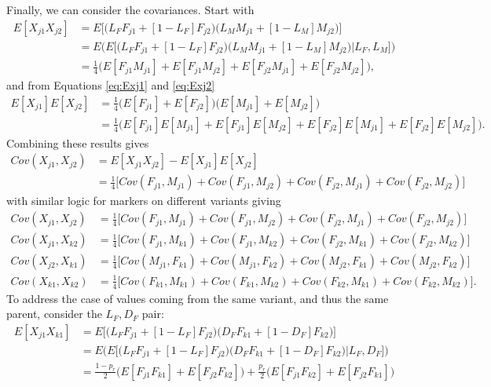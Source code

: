 \documentclass{article}
\begin{document}
Finally, we can consider the covariances. Start with
\begin{align*}
  E[X_{j1} X_{j2}] & = E \Big [ \big ( L_F F_{j1} + [1 - L_F] F_{j2} \big ) \big ( L_M M_{j1} + [1 - L_M] M_{j2} \big ) \Big ] \\
                    & = E \Bigg ( E \Big [ \big ( L_F F_{j1} + [1 - L_F] F_{j2} \big ) \big ( L_M M_{j1} + [1 - L_M] M_{j2} \big ) \Big | L_F, L_M \Big ] \Bigg )\\
  & = \frac{1}{4} \Big ( E[F_{j1} M_{j1}] + E[F_{j1} M_{j2}] + E[F_{j2} M_{j1}] + E[F_{j2} M_{j2}] \Big ),
\end{align*}
and from Equations \ref{eq:Exj1} and \ref{eq:Exj2}
\begin{align*}
  E[X_{j1}] E[X_{j2}] & = \frac{1}{4} \Big ( E[F_{j1}] + E[F_{j2}] \Big ) \Big ( E[M_{j1}] + E[M_{j2}] \Big ) \\
  & = \frac{1}{4} \Big ( E[F_{j1}] E[M_{j1}] + E[F_{j1}] E[M_{j2}] + E[F_{j2}] E[M_{j1}] + E[F_{j2}] E[M_{j2}] \Big ).
\end{align*}
Combining these results gives
\begin{align*}
  Cov(X_{j1}, X_{j2}) & = E[X_{j1} X_{j2}] - E[X_{j1}] E[X_{j2}] \\
                      & = \frac{1}{4} \Big [ Cov(F_{j1}, M_{j1}) + Cov(F_{j1}, M_{j2}) + Cov(F_{j2}, M_{j1}) + Cov(F_{j2}, M_{j2}) \Big ]
\end{align*}
with similar logic for markers on different variants giving
\begin{align}
  Cov(X_{j1}, X_{j2}) & = \frac{1}{4} \Big [ Cov(F_{j1}, M_{j1}) + Cov(F_{j1}, M_{j2}) + Cov(F_{j2}, M_{j1}) + Cov(F_{j2}, M_{j2}) \Big ] \label{eq:covj1j2} \\
  Cov(X_{j1}, X_{k2}) & = \frac{1}{4} \Big [ Cov(F_{j1}, M_{k1}) + Cov(F_{j1}, M_{k2}) + Cov(F_{j2}, M_{k1}) + Cov(F_{j2}, M_{k2}) \Big ] \label{eq:covj1k2} \\
  Cov(X_{j2}, X_{k1}) & = \frac{1}{4} \Big [ Cov(M_{j1}, F_{k1}) + Cov(M_{j1}, F_{k2}) + Cov(M_{j2}, F_{k1}) + Cov(M_{j2}, F_{k2}) \Big ] \label{eq:covj2k1} \\
  Cov(X_{k1}, X_{k2}) & = \frac{1}{4} \Big [ Cov(F_{k1}, M_{k1}) + Cov(F_{k1}, M_{k2}) + Cov(F_{k2}, M_{k1}) + Cov(F_{k2}, M_{k2}) \Big ] \label{eq:covk2k1}.
\end{align}
To address the case of values coming from the same variant, and thus the same parent, consider the $L_F, D_F$ pair:
\begin{align*}
  E[X_{j1} X_{k1}] & = E \Big [ \big ( L_F F_{j1} + [1 - L_F] F_{j2} \big ) \big ( D_F F_{k1} + [1 - D_F] F_{k2} \big ) \Big ] \\
                    & = E \Bigg ( E \Big [ \big ( L_F F_{j1} + [1 - L_F] F_{j2} \big ) \big ( D_F F_{k1} + [1 - D_F] F_{k2} \big ) \Big | L_F, D_F \Big ] \Bigg )\\
  & = \frac{1 - p_r}{2} \Big ( E[F_{j1} F_{k1}] + E[F_{j2} F_{k2} ] \Big ) + \frac{p_r}{2} \Big ( E[F_{j1} F_{k2}] + E[F_{j2} F_{k1}] \Big )
\end{align*}
\end{document}
